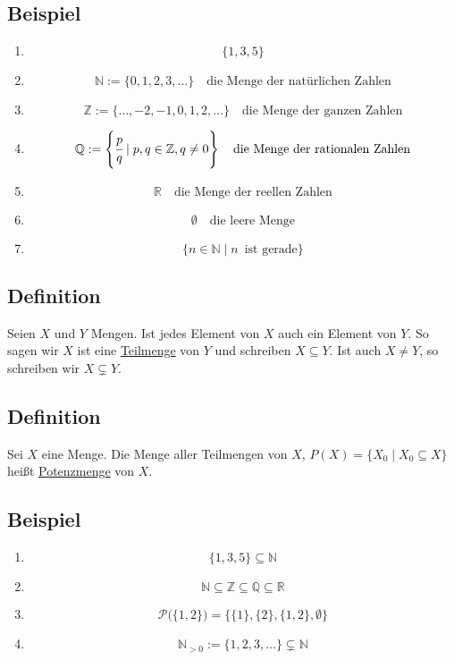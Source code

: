\subsection{Beispiel}
\begin{enumerate}
\item 
\[
\{ 1, 3, 5\}
\]

\item
\[
\mathds{N} := \{0, 1, 2, 3, \ldots \} \quad \text{die Menge der natürlichen Zahlen}
\]

\item
\[
\mathds{Z} := \{ \ldots, -2, -1, 0, 1, 2, \ldots \} \quad \text{die Menge der ganzen Zahlen}
\]

\item
\[
\mathds{Q} := \left\{ \cfrac{p}{q} \mid p,q \in \mathds{Z}, q \not= 0 \right\} \quad \text{die Menge der rationalen Zahlen}
\]

\item 
\[
\mathds{R} \quad \text{die Menge der reellen Zahlen}
\]

\item
\[
\emptyset \quad \text{die leere Menge}
\]

\item
\[
\{ n \in \mathds{N} \mid n \enspace \text{ist gerade} \}
\]
\end{enumerate}

\subsection{Definition}
Seien \(X\) und \(Y\) Mengen. Ist jedes Element von \(X\) auch ein Element von \(Y\). So sagen wir \(X\) ist eine \underline{Teilmenge} von \(Y\) und schreiben \(X \subseteq Y\). Ist auch \(X \not= Y\), so schreiben wir \(X \subsetneq Y\).

\subsection{Definition}
Sei \(X\) eine Menge. Die Menge aller Teilmengen von \(X\), \(P(X)=\{X_0 \mid X_0 \subseteq X \} \) heißt \underline{Potenzmenge} von \(X\).

\subsection{Beispiel}
\begin{enumerate}
\item
\[
\{1, 3, 5\} \subseteq \mathds{N}
\]

\item
\[
\mathds{N} \subseteq \mathds{Z} \subseteq \mathds{Q} \subseteq \mathds{R}
\]

\item
\[
\mathcal{P}\Big( \{1,2\} \Big) = \Big\{ \{1\}, \{2\}, \{1,2\}, \emptyset \Big\}
\]

\item
\[
\mathds{N}_{>0} := \{ 1,2,3, \ldots\} \subsetneq \mathds{N}
\]
\end{enumerate}

